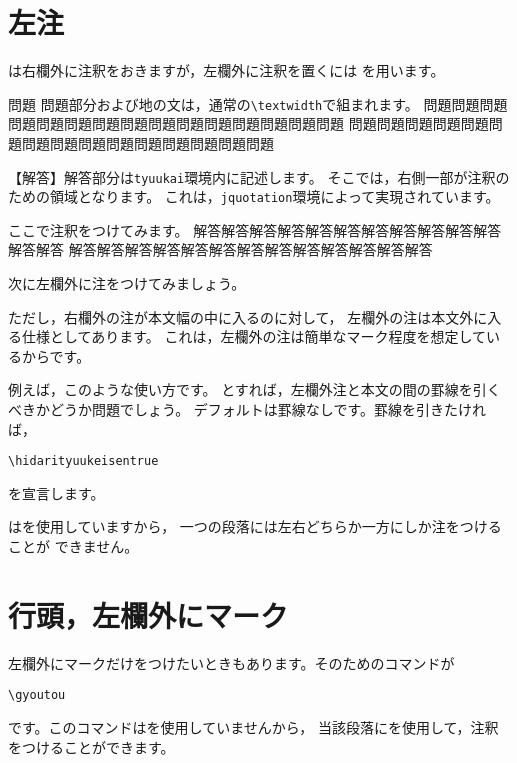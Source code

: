 \documentclass[a4j,fleqn]{jarticle}
\begin{document}
\section{左注}
は右欄外に注釈をおきますが，左欄外に注釈を置くには
を用います。

\tyuukeisentrue
\hidarityuukeisentrue
\begin{itembox}{問題}
問題部分および地の文は，通常の\verb+\textwidth+で組まれます。
問題問題問題問題問題問題問題問題問題問題問題問題問題問題問題
問題問題問題問題問題問題問題問題問題問題問題問題問題問題問題
\end{itembox}
\begin{tyuukai}
【解答】解答部分は\verb+tyuukai+環境内に記述します。
そこでは，右側一部が注釈のための領域となります。
これは，\verb+jquotation+環境によって実現されています。

ここで注釈をつけてみます。
解答解答解答解答解答解答解答解答解答解答解答解答解答
解答解答解答解答解答解答解答解答解答解答解答解答解答

次に左欄外に注をつけてみましょう。

ただし，右欄外の注が本文幅の中に入るのに対して，
左欄外の注は本文外に入る仕様としてあります。
これは，左欄外の注は簡単なマーク程度を想定しているからです。

例えば，このような使い方です。
とすれば，左欄外注と本文の間の罫線を引くべきかどうか問題でしょう。
デフォルトは罫線なしです。罫線を引きたければ，
\begin{jquote}
\begin{verbatim}
\hidarityuukeisentrue
\end{verbatim}
\end{jquote}
を宣言します。

はを使用していますから，
一つの段落には左右どちらか一方にしか注をつけることが
できません。
\end{tyuukai}
\clearpage

\section{行頭，左欄外にマーク}
左欄外にマークだけをつけたいときもあります。そのためのコマンドが
\begin{jquote}
\begin{verbatim}
\gyoutou
\end{verbatim}
\end{jquote}
です。このコマンドはを使用していませんから，
当該段落にを使用して，注釈をつけることができます。
\end{document}

